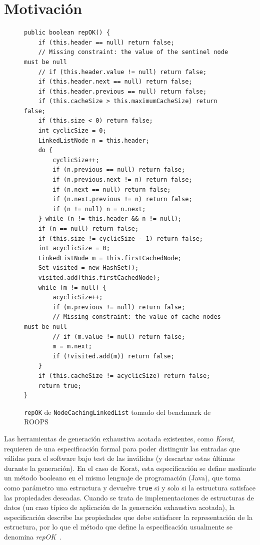 \section[Motivación]{Motivación}
\label{sec:motivating-example}


\begin{figure}[!thb]
\begin{lstlisting}
public boolean repOK() {
    if (this.header == null) return false;
    // Missing constraint: the value of the sentinel node must be null  
    // if (this.header.value != null) return false;
    if (this.header.next == null) return false;
    if (this.header.previous == null) return false;
    if (this.cacheSize > this.maximumCacheSize) return false;
    if (this.size < 0) return false;
    int cyclicSize = 0;
    LinkedListNode n = this.header;
    do {
        cyclicSize++;
        if (n.previous == null) return false;
        if (n.previous.next != n) return false;
        if (n.next == null) return false;
        if (n.next.previous != n) return false;
        if (n != null) n = n.next;
    } while (n != this.header && n != null);
    if (n == null) return false;
    if (this.size != cyclicSize - 1) return false;
    int acyclicSize = 0;
    LinkedListNode m = this.firstCachedNode;
    Set visited = new HashSet();
    visited.add(this.firstCachedNode);
    while (m != null) {
        acyclicSize++;
        if (m.previous != null) return false;
        // Missing constraint: the value of cache nodes must be null
        // if (m.value != null) return false;
        m = m.next;
        if (!visited.add(m)) return false;
    }
    if (this.cacheSize != acyclicSize) return false;
    return true;
}
\end{lstlisting}
\caption{\texttt{repOK} de \texttt{NodeCachingLinkedList} tomado del benchmark de \textsf{ROOPS}}
\label{fig:NCL-repOK}
\end{figure}
Las herramientas de generación exhaustiva acotada existentes, como \emph{Korat},
requieren de una especificación formal para poder distinguir las entradas
que válidas para el software bajo test de las inválidas (y descartar estas
últimas durante la generación).
En el caso de Korat, esta especificación se define mediante 
un método booleano en el mismo lenguaje de programación (Java), que toma como
parámetro una estructura y devuelve
\texttt{true} si y solo si la estructura satisface las propiedades deseadas.
Cuando se trata de implementaciones de estructuras de datos (un caso típico de
aplicación de la generación exhaustiva acotada), la especificación describe las
propiedades que debe satisfacer la representación de la estructura, por lo que 
el método que define la especificación usualmente se denomina \emph{repOK}~\cite{Boyapati02}. 

